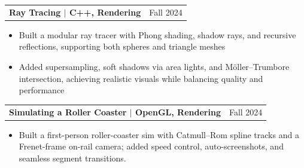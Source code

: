 \documentclass[letterpaper,11pt]{article}
\newcommand{\resumeItem}[1]{
  \item\small{
    {#1 
    }
  }
}
\newcommand{\resumeProjectHeading}[2]{
  \ifFirstSubheading
    \global\FirstSubheadingfalse
  \else
    \addvspace{4pt}
  \fi
  \item
  \begin{tabularx}{\textwidth}[t]{X r}
      \textbf{#1} & #2 \\
  \end{tabularx}
}
\newif\ifFirstSubheading
\newcommand{\resumeItemListStart}{\begin{itemize}}
\newcommand{\resumeItemListEnd}{\end{itemize}}
\begin{document}
  \resumeProjectHeading{\textbf{Ray Tracing} $|$ \normalfont C++, Rendering}
                       {Fall 2024}
    \resumeItemListStart
      \resumeItem{Built a modular ray tracer with Phong shading, shadow rays, and recursive reflections, supporting both spheres and triangle meshes} 
      \resumeItem{Added supersampling, soft shadows via area lights, and Möller–Trumbore intersection, achieving realistic visuals while balancing quality and performance}
    \resumeItemListEnd
  
  \resumeProjectHeading{\textbf{Simulating a Roller Coaster} $|$ \normalfont OpenGL, Rendering}
                       {Fall 2024}
    \resumeItemListStart
      \resumeItem{Built a first-person roller-coaster sim with Catmull–Rom spline tracks and a Frenet-frame on-rail camera; added speed control, auto-screenshots, and seamless segment transitions.}
    \resumeItemListEnd
  
    
\end{document}
